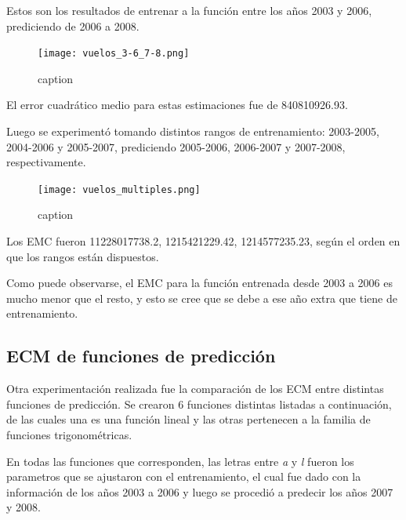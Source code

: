 Estos son los resultados de entrenar a la función entre los años 2003 y 2006, prediciendo de 2006 a 2008.

\begin{figure}[!htb]
\begin{center}
\texttt{[image: vuelos\_3-6\_7-8.png]}
\caption{caption}
\label{label}
\end{center}
\end{figure}

El error cuadrático medio para estas estimaciones fue de 840810926.93.

Luego se experimentó tomando distintos rangos de entrenamiento: 2003-2005, 2004-2006 y 2005-2007, prediciendo 2005-2006, 2006-2007 y 2007-2008, respectivamente.

\begin{figure}[!htb]
\begin{center}
\texttt{[image: vuelos\_multiples.png]}
\caption{caption}
\label{label}
\end{center}
\end{figure}

Los EMC fueron 11228017738.2, 1215421229.42, 1214577235.23, según el orden en que los rangos están dispuestos.

Como puede observarse, el EMC para la función entrenada desde 2003 a 2006 es mucho menor que el resto, y esto se cree que se debe a ese año extra que tiene de entrenamiento.


\subsection{ECM de funciones de predicción}

Otra experimentación realizada fue la comparación de los ECM entre distintas funciones de predicción. Se crearon 6 funciones distintas listadas a continuación, de las cuales una es una función lineal y las otras pertenecen a la familia de funciones trigonométricas.

En todas las funciones que corresponden, las letras entre \textit{a} y \textit{l} fueron los parametros que se ajustaron con el entrenamiento, el cual fue dado con la información de los años 2003 a 2006 y luego se procedió a predecir los años 2007 y 2008.

